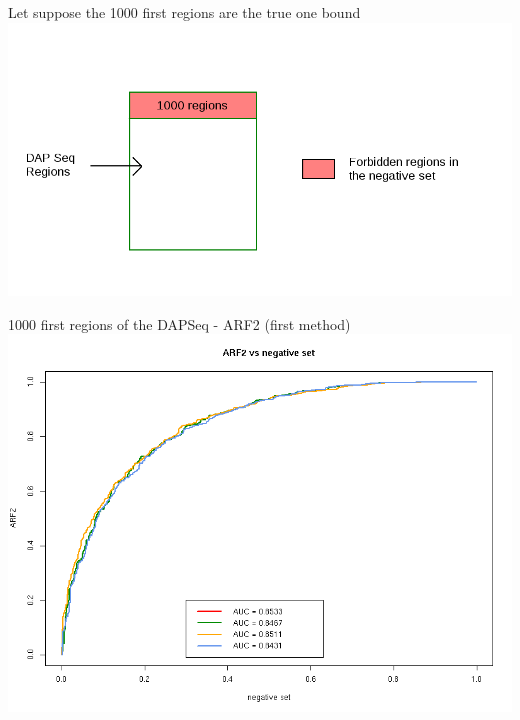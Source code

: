 \documentclass{beamer}
\begin{document}
\begin{frame}{Let suppose the 1000 first regions are the true one bound}
  \includegraphics[width=1\textwidth,height=0.8\textheight,center]{negative_set_1000_regions.png}
\end{frame}


\begin{frame}{1000 first regions of the DAPSeq - ARF2 (first method)}
  \includegraphics[width=1\textwidth,height=0.8\textheight,center]{ROC_ARF2_negative_set_all_regions.png}
\end{frame}
\end{document}
